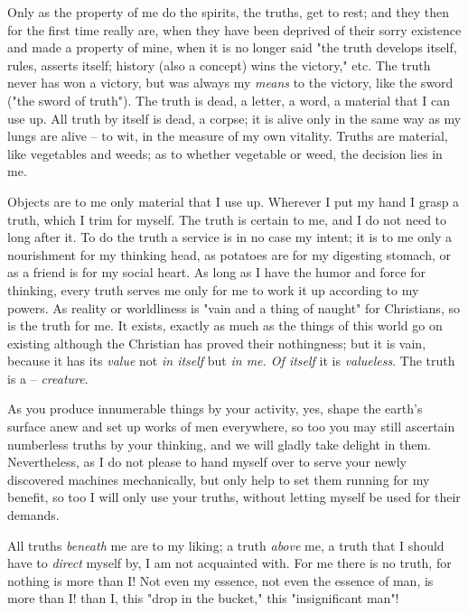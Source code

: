 Only as the property of me do the spirits, the truths, get to rest; and they 
then for the first time really are, when they have been deprived of their 
sorry existence and made a property of mine, when it is no longer said "{}the 
truth develops itself, rules, asserts itself; history (also a concept) wins 
the victory,"{} etc. The truth never has won a victory, but was always my 
\textit{means} to the victory, like the sword ("{}the sword of truth"{}). The 
truth is dead, a letter, a word, a material that I can use up. All truth by 
itself is dead, a corpse; it is alive only in the same way as my lungs are 
alive -- to wit, in the measure of my own vitality. Truths are material, like 
vegetables and weeds; as to whether vegetable or weed, the decision lies in 
me.

Objects are to me only material that I use up. Wherever I put my hand I grasp 
a truth, which I trim for myself. The truth is certain to me, and I do not 
need to long after it. To do the truth a service is in no case my intent; it 
is to me only a nourishment for my thinking head, as potatoes are for my 
digesting stomach, or as a friend is for my social heart. As long as I have 
the humor and force for thinking, every truth serves me only for me to work it 
up according to my powers. As reality or worldliness is "{}vain and a thing of 
naught"{} for Christians, so is the truth for me. It exists, exactly as much 
as the things of this world go on existing although the Christian has proved 
their nothingness; but it is vain, because it has its \textit{value} not 
\textit{in itself} but \textit{in me. Of itself} it is \textit{valueless}. The 
truth is a -- \textit{creature}.

As you produce innumerable things by your activity, yes, shape the earth's 
surface anew and set up works of men everywhere, so too you may still 
ascertain numberless truths by your thinking, and we will gladly take delight 
in them. Nevertheless, as I do not please to hand myself over to serve your 
newly discovered machines mechanically, but only help to set them running for 
my benefit, so too I will only use your truths, without letting myself be used 
for their demands.

All truths \textit{beneath} me are to my liking; a truth \textit{above} me, a 
truth that I should have to \textit{direct} myself by, I am not acquainted 
with. For me there is no truth, for nothing is more than I! Not even my 
essence, not even the essence of man, is more than I! than I, this "{}drop in 
the bucket,"{} this "{}insignificant man"{}!

